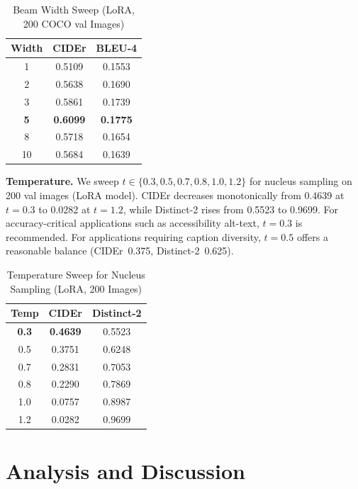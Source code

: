 \documentclass[conference]{IEEEtran}
\begin{document}
\begin{table}[t]
\caption{Beam Width Sweep (LoRA, 200 COCO val Images)}
\label{tab:beam_sweep}
\centering
\begin{tabular}{ccc}
\toprule
\textbf{Width} & \textbf{CIDEr} & \textbf{BLEU-4} \\
\midrule
1  & 0.5109 & 0.1553 \\
2  & 0.5638 & 0.1690 \\
3  & 0.5861 & 0.1739 \\
\textbf{5}  & \textbf{0.6099} & \textbf{0.1775} \\
8  & 0.5718 & 0.1654 \\
10 & 0.5684 & 0.1639 \\
\bottomrule
\end{tabular}
\end{table}

\textbf{Temperature.} We sweep $t \in \{0.3, 0.5, 0.7, 0.8, 1.0, 1.2\}$ for nucleus sampling on 200 val images (LoRA model). CIDEr decreases monotonically from 0.4639 at $t=0.3$ to 0.0282 at $t=1.2$, while Distinct-2 rises from 0.5523 to 0.9699. For accuracy-critical applications such as accessibility alt-text, $t=0.3$ is recommended. For applications requiring caption diversity, $t=0.5$ offers a reasonable balance (CIDEr~0.375, Distinct-2~0.625).

\begin{table}[t]
\caption{Temperature Sweep for Nucleus Sampling (LoRA, 200 Images)}
\label{tab:temp_sweep}
\centering
\begin{tabular}{ccc}
\toprule
\textbf{Temp} & \textbf{CIDEr} & \textbf{Distinct-2} \\
\midrule
\textbf{0.3} & \textbf{0.4639} & 0.5523 \\
0.5 & 0.3751 & 0.6248 \\
0.7 & 0.2831 & 0.7053 \\
0.8 & 0.2290 & 0.7869 \\
1.0 & 0.0757 & 0.8987 \\
1.2 & 0.0282 & 0.9699 \\
\bottomrule
\end{tabular}
\end{table}

\section{Analysis and Discussion}
\label{sec:discussion}
\end{document}
